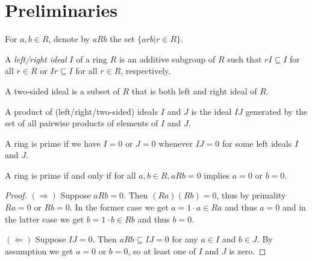 \section{Preliminaries}
\begin{definition}
  \label{def:aRb}
  \leanok
  For $a, b \in R$, denote by $aRb$ the set $\{arb| r \in R\}$.
\end{definition}

\begin{definition}
  \label{def:left_right_ideal}
  A \textit{left/right ideal} $I$ of a ring $R$ is an additive subgroup of $R$ such that $rI \subseteq I$ for all $r \in R$ or $Ir \subseteq I$ for all $r \in R$, respectively.
\end{definition}

\begin{definition}
  \label{def:two_sided_ideal}
  A two-sided ideal is a subset of $R$ that is both left and right ideal of $R$.
\end{definition}

\begin{definition}
  \label{def:product_of_ideals}
  A product of (left/right/two-sided) ideals $I$ and $J$ is the ideal $IJ$ generated by the set of all pairwise products of elements of $I$ and $J$.
\end{definition}

\begin{definition}
  \label{def:IsPrimeRing}
  \leanok
  A ring is prime if we have $I = 0$ or $J = 0$ whenever $IJ = 0$ for some left ideals $I$ and $J$.
\end{definition}

\begin{theorem}
  \label{thm:prime_ring_equiv}
  \leanok
  A ring is prime if and only if for all $a, b \in R, aRb = 0$ implies $a = 0$ or $b = 0$.
\end{theorem}
\begin{proof}
  \leanok
  $(\Rightarrow)$ Suppose $aRb = 0$. Then $(Ra)(Rb) = 0$, thus by primality $Ra = 0$ or $Rb = 0$. In the former case we get $a = 1 \cdot a \in Ra$ and thus $a = 0$ and in the latter case we get $b = 1 \cdot b \in Rb$ and thus $b = 0$.

  $(\Leftarrow)$ Suppose $IJ = 0$. Then $aRb  \subseteq IJ = 0$ for any $a \in I$ and $b \in J$. By assumption we get $a = 0$ or $b = 0$, so at least one of $I$ and $J$ is zero.
\end{proof}

